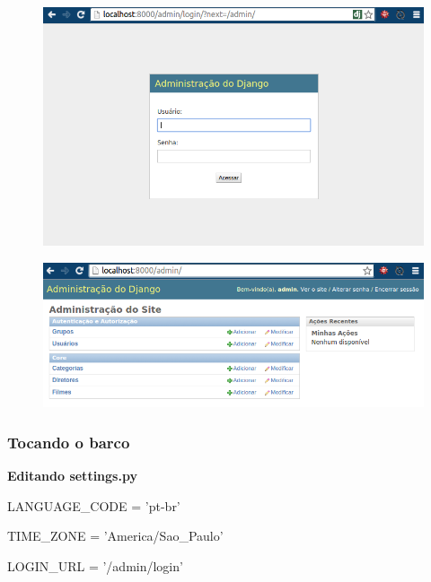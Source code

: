 \documentclass[aspectratio=169]{beamer}
\begin{document}
\begin{frame}

	\begin{figure}[h]
	  \centering
  		\includegraphics[height=.9\paperheight]{img/admin1.png}
	\end{figure}

\end{frame}

\begin{frame}

	\begin{figure}[h]
	  \centering
  		\includegraphics[width=.9\paperwidth]{img/admin2.png}
	\end{figure}

\end{frame}

\begin{frame}[fragile]\frametitle{Tocando o barco}

\textbf{Editando settings.py}

\begin{pythoncode}
	LANGUAGE_CODE = 'pt-br'

	TIME_ZONE = 'America/Sao_Paulo'

	LOGIN_URL = '/admin/login'
\end{pythoncode}


\end{frame}
\end{document}
